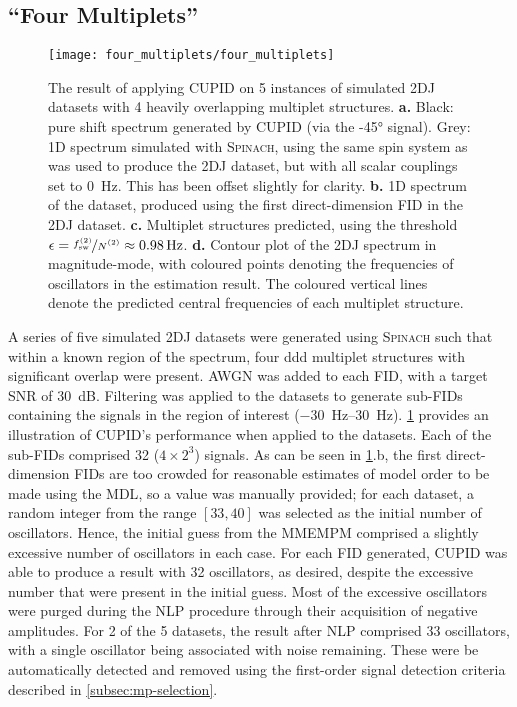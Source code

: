 \subsection{``Four Multiplets''}
\label{subsec:four-mp}
\begin{figure}
    \centering
    \texttt{[image: four\_multiplets/four\_multiplets]}
    \caption[
        The result of applying \acs{CUPID} on 5 instances of simulated
        \acs{2DJ} datasets with 4 heavily overlapping multiplet structures.
    ]{
        The result of applying \ac{CUPID} on 5 instances of simulated \ac{2DJ}
        datasets with 4 heavily overlapping multiplet structures.
        \textbf{a.} Black: pure shift spectrum generated by \ac{CUPID} (via the
        \ang{-45} signal).
        Grey: \ac{1D} spectrum simulated with \textsc{Spinach}, using the same spin
        system as was used to produce the \ac{2DJ} dataset, but with all scalar
        couplings set to \qty{0}{\hertz}. This has been offset slightly for
        clarity.
        \textbf{b.} \ac{1D} spectrum of the dataset, produced using the first
        direct-dimension \ac{FID} in the \ac{2DJ} dataset.
        \textbf{c.} Multiplet structures predicted, using the threshold $\epsilon
        = \nicefrac{\fswtwo}{\Ntwo} \approx \qty{0.98}{\hertz}$.
        \textbf{d.} Contour plot of the \ac{2DJ} spectrum in magnitude-mode,
        with coloured points denoting the frequencies of oscillators in the
        estimation result. The coloured vertical lines denote the predicted
        central frequencies of each multiplet structure.
    }
    \label{fig:four-multiplets}
\end{figure}

A series of five simulated \ac{2DJ} datasets
were generated using \textsc{Spinach} such that within a
known region of the spectrum, four ddd multiplet
structures with significant overlap were present. \ac{AWGN} was added to each
\ac{FID}, with a target \ac{SNR} of \qty{30}{\deci\bel}.
Filtering was applied to the datasets to generate sub-\acp{FID} containing the
signals in the region of interest
(\SIrange{-30}{30}{\hertz}).
\cref{fig:four-multiplets} provides an illustration of \ac{CUPID}'s performance
when applied to the datasets.
Each of the sub-\acp{FID} comprised 32 ($4 \times 2^3$) signals.
As can be seen in \cref{fig:four-multiplets}.b, the first direct-dimension
\acp{FID} are too crowded for reasonable estimates of model
order to be made using the \ac{MDL}, so a value was manually provided; for each
dataset, a random
integer from the range $[33, 40]$ was selected as the initial number of
oscillators. Hence, the initial guess from the \ac{MMEMPM} comprised a
slightly excessive number of oscillators in each case.
For each \ac{FID} generated, \ac{CUPID} was able to produce a
result with 32 oscillators, as desired, despite the excessive number
that were present in the initial guess. Most of the excessive oscillators were
purged during the \ac{NLP} procedure through their acquisition of negative
amplitudes.
For 2 of the 5 datasets, the result after \ac{NLP} comprised 33
oscillators, with a single oscillator being associated with noise remaining.
These were be automatically detected and removed using the first-order signal
detection criteria described in \cref{subsec:mp-selection}.

